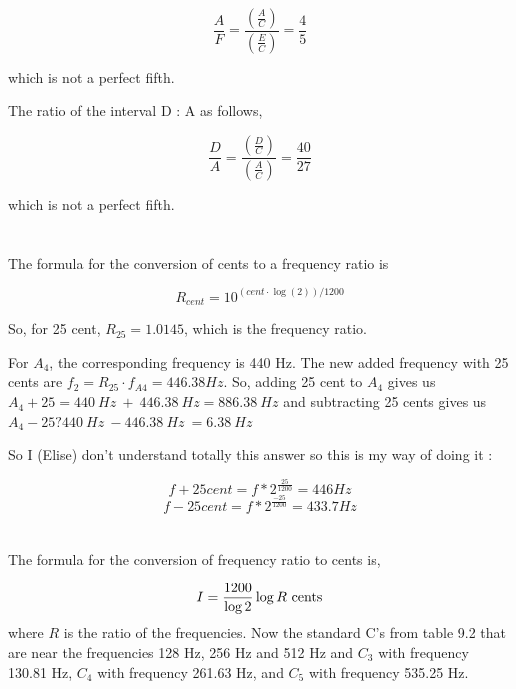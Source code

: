 \documentclass{article}
\begin{document}
\begin{equation}
    \frac{A}{F}=\frac{(\frac{A}{C})}{(\frac{E}{C})} = \frac{4}{5}
\end{equation}

which is not a perfect fifth.

The ratio of the interval D : A as follows,

\begin{equation}
    \frac{D}{A}=\frac{(\frac{D}{C})}{(\frac{A}{C})} = \frac{40}{27}
\end{equation}

which is not a perfect fifth.

\section{}

The formula for the conversion of cents to a frequency ratio is

\begin{equation}
    R_{cent}=10^{(cent \cdot \log(2))/1200}
\end{equation}

So, for 25 cent, $R_{25}=1.0145$, which is the frequency ratio.

For $A_4$, the corresponding frequency is 440 Hz. The new added frequency with 25 cents are $f_2=R_{25}\cdot f_{A4}=446.38 Hz$. So, adding 25 cent to $A_4$ gives us $A_4+25 = 440 \ Hz \ + \ 446.38 \ Hz = 886.38 \ Hz $ and subtracting 25 cents gives us $A_4 - 25 ? 440 \ Hz \ - 446.38 \ Hz \ = 6.38 \ Hz$

So I (Elise) don't understand totally this answer so this is my way of doing it :

\begin{equation}
    f+25cent=f*2^{\frac{25}{1200}}=446Hz
\end{equation}
\begin{equation}
    f-25cent=f*2^{\frac{-25}{1200}}=433.7Hz
\end{equation}

\section{}

The formula for the conversion of frequency ratio to cents is,

\begin{equation}
    I = \frac{1200}{\log{2}} \log{R}\ {\rm cents}
\end{equation}
where $R$ is the ratio of the frequencies. Now the standard C's  from table 9.2 that are near the frequencies 128 Hz, 256 Hz and 512 Hz and $C_3$ with frequency 130.81 Hz, $C_4$ with frequency 261.63 Hz, and $C_5$ with frequency 535.25 Hz.
\end{document}
